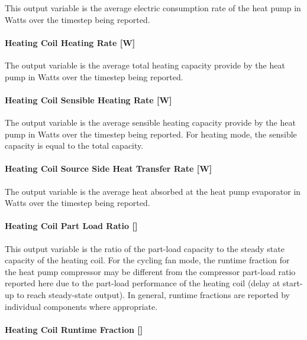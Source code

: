 This output variable is the average electric consumption rate of the heat pump in Watts over the timestep being reported.

\paragraph{Heating Coil Heating Rate {[}W{]}}\label{heating-coil-heating-rate-w-9}

The output variable is the average total heating capacity provide by the heat pump in Watts over the timestep being reported.

\paragraph{Heating Coil Sensible Heating Rate {[}W{]}}\label{heating-coil-sensible-heating-rate-w}

The output variable is the average sensible heating capacity provide by the heat pump in Watts over the timestep being reported. For heating mode, the sensible capacity is equal to the total capacity.

\paragraph{Heating Coil Source Side Heat Transfer Rate {[}W{]}}\label{heating-coil-source-side-heat-transfer-rate-w}

The output variable is the average heat absorbed at the heat pump evaporator in Watts over the timestep being reported.

\paragraph{Heating Coil Part Load Ratio {[]}}\label{heating-coil-part-load-ratio}

This output variable is the ratio of the part-load capacity to the steady state capacity of the heating coil. For the cycling fan mode, the runtime fraction for the heat pump compressor may be different from the compressor part-load ratio reported here due to the part-load performance of the heating coil (delay at start-up to reach steady-state output). In general, runtime fractions are reported by individual components where appropriate.

\paragraph{Heating Coil Runtime Fraction {[]}}\label{heating-coil-runtime-fraction-6}

